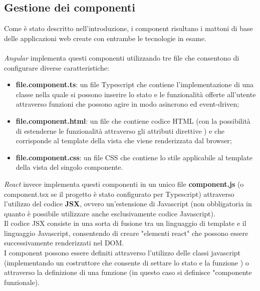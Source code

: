 \subsection{Gestione dei componenti}
Come è stato descritto nell'introduzione, i component risultano i mattoni di base delle applicazioni web create con entrambe le tecnologie in esame. \\ \\
\textit{Angular} implementa questi componenti utilizzando tre file che consentono di configurare diverse caratteristiche:
\begin{itemize}
	\item \textbf{file.component.ts}: un file Typescript che contiene l'implementazione di una classe nella quale si possono inserire lo stato e le funzionalità offerte all'utente attraverso funzioni che possono agire in modo asincrono ed event-driven;
	\item \textbf{file.component.html}: un file che contiene codice HTML (con la possibilità di estenderne le funzionalità attraverso gli attributi direttive ) e che corrisponde al template della vista che viene renderizzata dal browser;
	\item \textbf{file.component.css}: un file CSS che contiene lo stile applicabile al template della vista del singolo componente. \\
\end{itemize}
\textit{React} invece implementa questi componenti in un unico file \textbf{component.js} (o component.tsx se il progetto è stato configurato per Typescript) attraverso l'utilizzo del codice \textbf{JSX}, ovvero un'estensione di Javascript (non obbligatoria in quanto è possibile utilizzare anche esclusivamente codice Javascript). \\
Il codice JSX consiste in una sorta di fusione tra un linguaggio di template e il linguaggio Javascript, consentendo di creare "elementi react" che possono essere successivamente renderizzati nel DOM. \\
I component possono essere definiti attraverso l'utilizzo delle classi javascript (implementando un costruttore che consente di settare lo stato e la funzione ) o attraverso la definizione di una funzione (in questo caso si definisce "componente funzionale).

